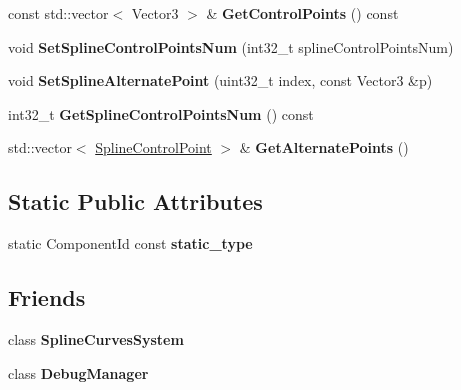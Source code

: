 \begin{DoxyCompactItemize}
\item 
\mbox{\label{classSplineCurvesComponent_abcff1b9a16e49fabb89453682a53d23d}} 
const std\+::vector$<$ Vector3 $>$ \& {\bfseries Get\+Control\+Points} () const
\item 
\mbox{\label{classSplineCurvesComponent_a38d8371f2180a0cef01e19e8c129a5da}} 
void {\bfseries Set\+Spline\+Control\+Points\+Num} (int32\+\_\+t spline\+Control\+Points\+Num)
\item 
\mbox{\label{classSplineCurvesComponent_aacc755b8bb2d968103f3d665c79b4cfd}} 
void {\bfseries Set\+Spline\+Alternate\+Point} (uint32\+\_\+t index, const Vector3 \&p)
\item 
\mbox{\label{classSplineCurvesComponent_ab9aec72d6fc17e4b46e06ff085ce53cc}} 
int32\+\_\+t {\bfseries Get\+Spline\+Control\+Points\+Num} () const
\item 
\mbox{\label{classSplineCurvesComponent_a5a6c3b95cb0a002d1b391d4a743eaffa}} 
std\+::vector$<$ \hyperlink{structSplineControlPoint}{Spline\+Control\+Point} $>$ \& {\bfseries Get\+Alternate\+Points} ()
\end{DoxyCompactItemize}
\subsection*{Static Public Attributes}
\begin{DoxyCompactItemize}
\item 
\mbox{\label{classSplineCurvesComponent_a8f4033bb5b77c17e6fef58bfef3434e9}} 
static Component\+Id const {\bfseries static\+\_\+type}
\end{DoxyCompactItemize}
\subsection*{Friends}
\begin{DoxyCompactItemize}
\item 
\mbox{\label{classSplineCurvesComponent_acf9526ddc1cae0aba473a2eeb87cebd8}} 
class {\bfseries Spline\+Curves\+System}
\item 
\mbox{\label{classSplineCurvesComponent_aa81a2e787af81f4fb4b7322fce0b27be}} 
class {\bfseries Debug\+Manager}
\end{DoxyCompactItemize}
